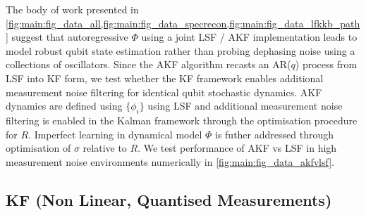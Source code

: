 The body of work presented in \cref{fig:main:fig_data_all,fig:main:fig_data_specrecon,fig:main:fig_data_lfkkb_path} suggest that autoregressive $\Phi$ using a joint LSF / AKF implementation leads to model robust qubit state estimation rather than probing dephasing noise using a collections of oscillators. Since the AKF algorithm recasts an AR($q$) process from LSF into KF form, we test whether the KF framework enables additional measurement noise filtering for identical qubit stochastic dynamics. AKF dynamics are defined using $\{ \phi_i \}$ using LSF and additional measurement noise filtering is enabled in the Kalman framework through the optimisation procedure for $R$. Imperfect learning in dynamical model $\Phi$ is futher addressed through optimisation of $\sigma$ relative to $R$. We test performance of AKF vs LSF in high measurement noise environments numerically in \cref{fig:main:fig_data_akfvlsf}. 

\subsection{KF (Non Linear, Quantised Measurements)}

